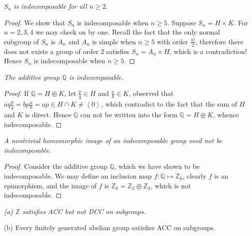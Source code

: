 \begin{problem}\em
$S_n$ is indecomposable for all $n\ge 2$.
\end{problem}
\begin{proof}
We show that $S_n$ is indecomposable when $n\ge 5$. Suppose $S_n=H\times K$. For $n=2,3,4$ we may check on by one. Recall the fact that the only normal subgroup of $S_n$ is $A_n$ and $A_n$ is simple when $n\ge 5$ with order $\frac{n!}{2}$, therefore there does not exists a group of order $2$ satisfies $S_n=A_n\times H$, which is a contradiction! Hence $S_n$ is indecomposable when $n\ge 5$.
\end{proof}
\begin{problem}\em
The additive group $\mathbb{Q}$ is indecomposable.
\end{problem}
\begin{proof}
If $\mathbb{Q}=H\oplus K$, let $\frac{p}{q}\in H$ and $\frac{a}{b}\in K$, observed that $aq\frac{p}{q}=bp\frac{a}{b}=ap\in H\cap K\ne\left<0\right>$, which contradict to the fact that the sum of $H$ and $K$ is direct. Hence $\mathbb{Q}$ can not be written into the form $\mathbb{Q}=H\oplus K$, whence indecomposable.
\end{proof}
\begin{problem}\em
A nontrivial homomorphic image of an indecomposable group need not be indecomposable.
\end{problem}
\begin{proof}
Consider the additive group $\mathbb{Q}$, which we have shown to be indecomposable. We may define an inclusion map $f:\mathbb{Q}\mapsto\mathbb{Z}_6$, clearly $f$ is an epimorphism, and the image of $f$ is $\mathbb{Z}_6=\mathbb{Z}_2\oplus\mathbb{Z}_3$, which is not indecomposable.
\end{proof}
\begin{problem}\em
(a) $\mathbb{Z}$ satisfies ACC but not DCC on subgroups.\par
(b) Every finitely generated abelian group satisfies ACC on subgroups.
\end{problem}
